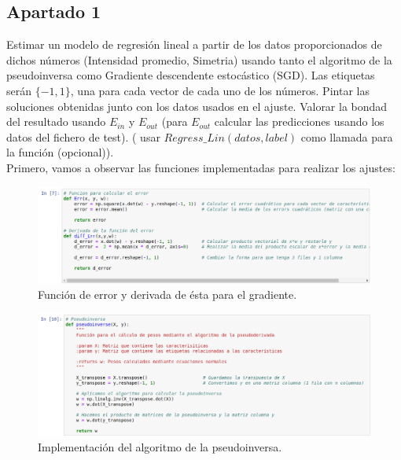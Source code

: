 \documentclass[11pt,a4paper]{article}
\begin{document}
\subsection*{Apartado 1}
Estimar un modelo de regresión lineal a partir de los datos proporcionados de dichos números (Intensidad promedio, Simetria)
usando tanto el algoritmo de la pseudoinversa como Gradiente descendente estocástico (SGD). Las etiquetas serán
$ \lbrace -1, 1 \rbrace $, una para cada vector de cada uno de los números. Pintar las soluciones obtenidas junto con los
datos usados en el ajuste. Valorar la bondad del resultado usando $E_{in}$ y $E_{out}$ (para $E_{out}$ calcular las
predicciones usando los datos del fichero de test). ( usar $Regress\_Lin(datos, label)$ como llamada para la función
(opcional)).\\

Primero, vamos a observar las funciones implementadas para realizar los ajustes:

\begin{figure}[H]
\centering
\includegraphics[scale=0.4]{img/func_error.png}
\caption{Función de error y derivada de ésta para el gradiente.}
\end{figure}

\begin{figure}[H]
\centering
\includegraphics[scale=0.4]{img/pseudoinverse.png}
\caption{Implementación del algoritmo de la pseudoinversa.}
\end{figure}
\end{document}

